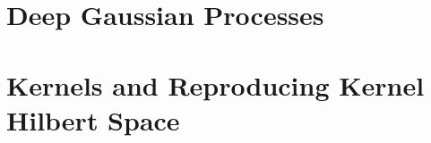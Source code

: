 









\section{Deep Gaussian Processes}



\section{Kernels and Reproducing Kernel Hilbert Space}

